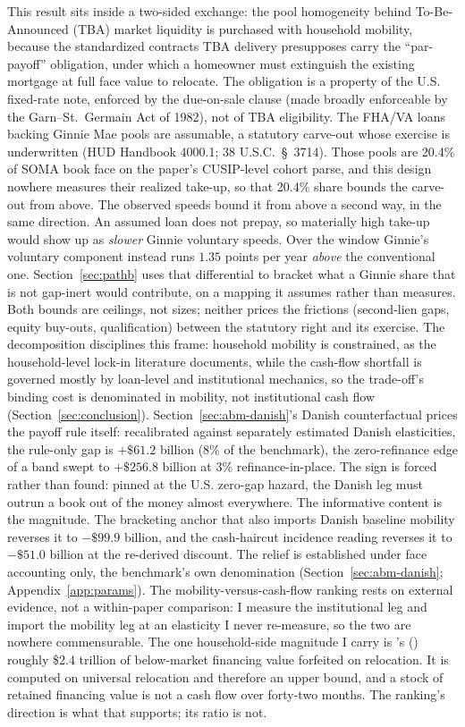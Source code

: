 \documentclass[12pt]{article}
\newcommand{\citepos}[1]{\citeauthor{#1}'s (\citeyear{#1})}
\begin{document}
This result sits inside a two-sided exchange: the pool homogeneity behind To-Be-Announced (TBA) market liquidity \citep[the market's institutional design is reviewed in][]{fuster2023} is purchased with household mobility, because the standardized contracts TBA delivery presupposes carry the ``par-payoff'' obligation, under which a homeowner must extinguish the existing mortgage at full face value to relocate. The obligation is a property of the U.S. fixed-rate note, enforced by the due-on-sale clause (made broadly enforceable by the Garn--St.~Germain Act of 1982), not of TBA eligibility. The FHA/VA loans backing Ginnie Mae pools are assumable, a statutory carve-out whose exercise is underwritten (HUD Handbook 4000.1; 38 U.S.C.~\S~3714). Those pools are 20.4\% of SOMA book face on the paper's CUSIP-level cohort parse, and this design nowhere measures their realized take-up, so that 20.4\% share bounds the carve-out from above. The observed speeds bound it from above a second way, in the same direction. An assumed loan does not prepay, so materially high take-up would show up as \emph{slower} Ginnie voluntary speeds. Over the window Ginnie's voluntary component instead runs $1.35$ points per year \emph{above} the conventional one. Section~\ref{sec:pathb} uses that differential to bracket what a Ginnie share that is not gap-inert would contribute, on a mapping it assumes rather than measures. Both bounds are ceilings, not sizes; neither prices the frictions (second-lien gaps, equity buy-outs, qualification) between the statutory right and its exercise. The decomposition disciplines this frame: household mobility is constrained, as the household-level lock-in literature documents, while the cash-flow shortfall is governed mostly by loan-level and institutional mechanics, so the trade-off's binding cost is denominated in mobility, not institutional cash flow (Section~\ref{sec:conclusion}). Section~\ref{sec:abm-danish}'s Danish counterfactual prices the payoff rule itself: recalibrated against separately estimated Danish elasticities, the rule-only gap is $+\$61.2$ billion (8\% of the benchmark), the zero-refinance edge of a band swept to $+\$256.8$ billion at 3\% refinance-in-place. The sign is forced rather than found: pinned at the U.S. zero-gap hazard, the Danish leg must outrun a book out of the money almost everywhere. The informative content is the magnitude. The bracketing anchor that also imports Danish baseline mobility reverses it to $-\$99.9$ billion, and the cash-haircut incidence reading reverses it to $-\$51.0$ billion at the re-derived discount. The relief is established under face accounting only, the benchmark's own denomination (Section~\ref{sec:abm-danish}; Appendix~\ref{app:params}). The mobility-versus-cash-flow ranking rests on external evidence, not a within-paper comparison: I measure the institutional leg and import the mobility leg at an elasticity I never re-measure, so the two are nowhere commensurable. The one household-side magnitude I carry is \citepos{batzer2024} roughly \$2.4 trillion of below-market financing value forfeited on relocation. It is computed on universal relocation and therefore an upper bound, and a stock of retained financing value is not a cash flow over forty-two months. The ranking's direction is what that supports; its ratio is not.
\end{document}
